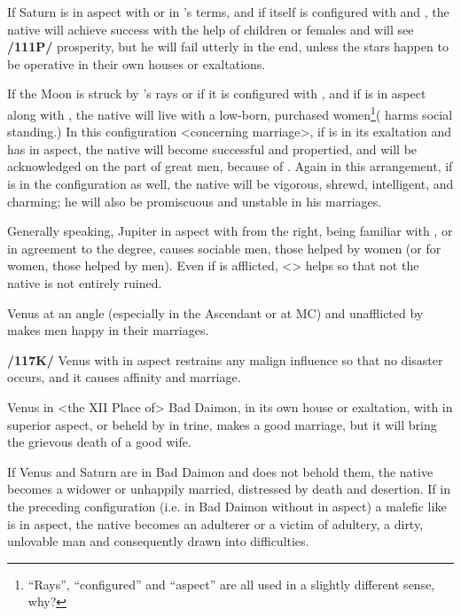If Saturn is in aspect with \Venus\xspace or in \Venus’s terms, and if \Venus\xspace itself is configured with \Jupiter\xspace and \Mars, the native will achieve success with the help of children or females and will see \textbf{/111P/} prosperity, but  he will fail utterly in the end, unless the stars happen to be operative in their own houses or
exaltations. 

If  the Moon is struck by \Jupiter’s rays or if it is configured with \Jupiter, and if \Saturn\xspace is in aspect along with \Jupiter, the native will live with a low-born, purchased women\footnote{``Rays'', ``configured'' and ``aspect'' are all used in a slightly different sense, why?}(\Saturn\xspace harms social standing.) In this configuration <concerning marriage>, if \Venus\xspace is in its exaltation and has \Jupiter\xspace in aspect, the native will become successful and propertied, and will be acknowledged on the part of great men, because of \Venus. Again in this arrangement, if \Mercury\xspace is in the configuration as well, the native will be vigorous, shrewd, intelligent, and charming; he will also be promiscuous and unstable in his marriages. 

Generally speaking, Jupiter in aspect with \Venus\xspace from the right, being familiar with \Venus, or in agreement to the degree, causes sociable men, those helped by women (or for women, those helped by men). Even if \Venus\xspace is afflicted, <\Jupiter> helps so that not the native is not entirely ruined.

Venus at an angle (especially in the Ascendant or at MC) and unafflicted by \Saturn\xspace makes men happy
in their marriages. 

\textbf{/117K/} Venus with \Jupiter\xspace in aspect restrains any malign influence so that no disaster occurs, and it causes affinity and marriage. 

Venus in <the XII Place of> Bad Daimon, in its own house or exaltation, with \Jupiter\xspace in superior aspect, or beheld by \Jupiter\xspace in trine, makes a good marriage, but it will bring the grievous death of a good wife. 

If Venus and Saturn are in Bad Daimon and \Jupiter\xspace does not behold them, the native becomes a widower or unhappily married, distressed by death and desertion. If in the preceding configuration (i.e. \Venus\xspace in Bad Daimon without \Jupiter\xspace in aspect) a malefic like \Mars\xspace is in aspect, the native becomes an adulterer or a victim of adultery, a dirty, unlovable man and consequently drawn into difficulties. 

